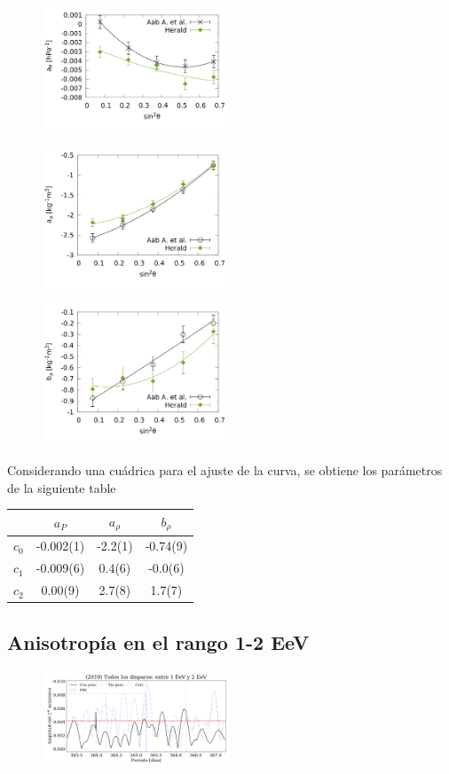 \begin{figure}[H]
	\centering
	\includegraphics[width=0.5\textwidth]{ap.png}
\end{figure}


\begin{figure}[H]
	\centering
	\includegraphics[width=0.5\textwidth]{arho.png}
\end{figure}


\begin{figure}[H]
	\centering
	\includegraphics[width=0.5\textwidth]{brho.png}
\end{figure}




Considerando una cuádrica para el ajuste de la curva, se obtiene los parámetros de la siguiente table
\begin{table}[H]
\centering
\begin{tabular}{c|c|c|c}
		 	& $a_P$ 	&  $a_\rho$  & $ b_\rho$ \\ \hline
$c_0$ 		& -0.002(1) & 	-2.2(1)	 &	-0.74(9)\\ \hline
$c_1$ 		& -0.009(6)	& 	 0.4(6)	 &	-0.0(6)\\ \hline
$c_2$ 		&  0.00(9) 	& 	 2.7(8)  &	 1.7(7)\\ \hline
\end{tabular}
\end{table}


\subsection{Anisotropía en el rango 1-2 EeV}

\begin{figure}[htbp]
	\centering
	\includegraphics[width=0.5\textwidth]{ani_corr.png}
\end{figure}
